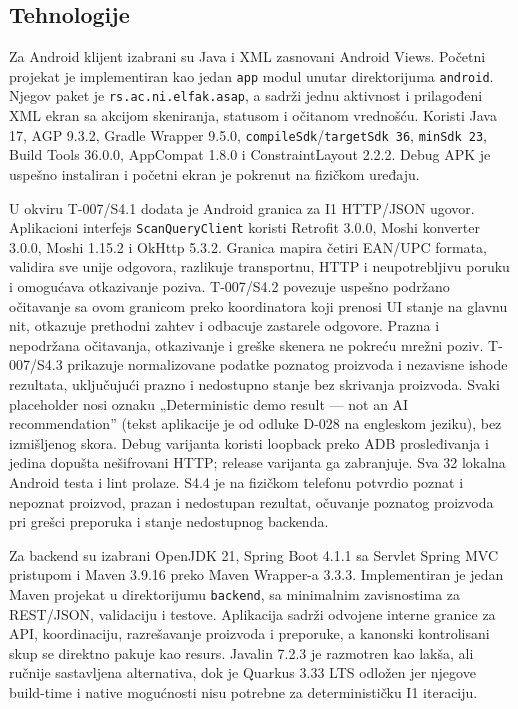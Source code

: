 \documentclass[12pt,a4paper]{article}
\begin{document}
\subsection{Tehnologije}

Za Android klijent izabrani su Java i XML zasnovani Android Views. Početni projekat je implementiran kao jedan \texttt{app} modul unutar direktorijuma \texttt{android}. Njegov paket je \texttt{rs.ac.ni.elfak.asap}, a sadrži jednu aktivnost i prilagođeni XML ekran sa akcijom skeniranja, statusom i očitanom vrednošću. Koristi Java 17, AGP 9.3.2, Gradle Wrapper 9.5.0, \texttt{compileSdk}/\texttt{targetSdk 36}, \texttt{minSdk 23}, Build Tools 36.0.0, AppCompat 1.8.0 i ConstraintLayout 2.2.2. Debug APK je uspešno instaliran i početni ekran je pokrenut na fizičkom uređaju.

U okviru T-007/S4.1 dodata je Android granica za I1 HTTP/JSON ugovor. Aplikacioni interfejs \texttt{ScanQueryClient} koristi Retrofit 3.0.0, Moshi konverter 3.0.0, Moshi 1.15.2 i OkHttp 5.3.2. Granica mapira četiri EAN/UPC formata, validira sve unije odgovora, razlikuje transportnu, HTTP i neupotrebljivu poruku i omogućava otkazivanje poziva. T-007/S4.2 povezuje uspešno podržano očitavanje sa ovom granicom preko koordinatora koji prenosi UI stanje na glavnu nit, otkazuje prethodni zahtev i odbacuje zastarele odgovore. Prazna i nepodržana očitavanja, otkazivanje i greške skenera ne pokreću mrežni poziv. T-007/S4.3 prikazuje normalizovane podatke poznatog proizvoda i nezavisne ishode rezultata, uključujući prazno i nedostupno stanje bez skrivanja proizvoda. Svaki placeholder nosi oznaku „Deterministic demo result --- not an AI recommendation” (tekst aplikacije je od odluke D-028 na engleskom jeziku), bez izmišljenog skora. Debug varijanta koristi loopback preko ADB prosleđivanja i jedina dopušta nešifrovani HTTP; release varijanta ga zabranjuje. Sva 32 lokalna Android testa i lint prolaze. S4.4 je na fizičkom telefonu potvrdio poznat i nepoznat proizvod, prazan i nedostupan rezultat, očuvanje poznatog proizvoda pri grešci preporuka i stanje nedostupnog backenda.

Za backend su izabrani OpenJDK 21, Spring Boot 4.1.1 sa Servlet Spring MVC pristupom i Maven 3.9.16 preko Maven Wrapper-a 3.3.3. Implementiran je jedan Maven projekat u direktorijumu \texttt{backend}, sa minimalnim zavisnostima za REST/JSON, validaciju i testove. Aplikacija sadrži odvojene interne granice za API, koordinaciju, razrešavanje proizvoda i preporuke, a kanonski kontrolisani skup se direktno pakuje kao resurs. Javalin 7.2.3 je razmotren kao lakša, ali ručnije sastavljena alternativa, dok je Quarkus 3.33 LTS odložen jer njegove build-time i native mogućnosti nisu potrebne za determinističku I1 iteraciju.
\end{document}
